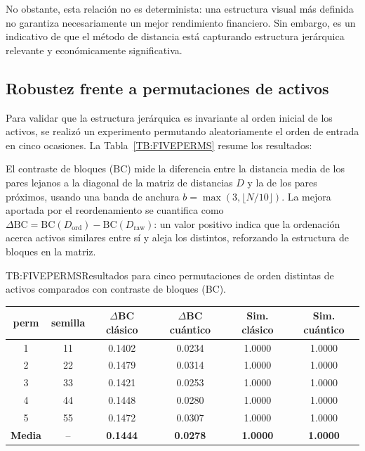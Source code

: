 No obstante, esta relación no es determinista: una estructura visual más definida no garantiza necesariamente un mejor rendimiento financiero. Sin embargo, es un indicativo de que el método de distancia está capturando estructura jerárquica relevante y económicamente significativa.

\subsection{Robustez frente a permutaciones de activos}
\label{subsec:robustez_permutaciones}

Para validar que la estructura jerárquica es invariante al orden inicial de los activos, se realizó un experimento permutando aleatoriamente el orden de entrada en cinco ocasiones. La Tabla~\ref{TB:FIVEPERMS} resume los resultados:

El contraste de bloques ($\mathrm{BC}$) mide la diferencia entre la distancia media de los pares lejanos a la diagonal de la matriz de distancias $D$ y la de los pares próximos, usando una banda de anchura $b = \max(3, \lfloor N/10 \rfloor)$. La mejora aportada por el reordenamiento se cuantifica como $\Delta\mathrm{BC} = \mathrm{BC}(D_{\text{ord}}) - \mathrm{BC}(D_{\text{raw}})$: un valor positivo indica que la ordenación acerca activos similares entre sí y aleja los distintos, reforzando la estructura de bloques en la matriz.

\begin{table}[Cinco permutaciones de activos]{TB:FIVEPERMS}{Resultados para cinco permutaciones de orden distintas de activos comparados con contraste de bloques (BC).}
\begin{tabular}{cccccc}
\hline
\textbf{perm} & \textbf{semilla} & \textbf{$\Delta$BC clásico} & \textbf{$\Delta$BC cuántico} & \textbf{Sim. clásico} & \textbf{Sim. cuántico} \\
\hline
1 & 11 & 0.1402 & 0.0234 & 1.0000 & 1.0000 \\
2 & 22 & 0.1479 & 0.0314 & 1.0000 & 1.0000 \\
3 & 33 & 0.1421 & 0.0253 & 1.0000 & 1.0000 \\
4 & 44 & 0.1448 & 0.0280 & 1.0000 & 1.0000 \\
5 & 55 & 0.1472 & 0.0307 & 1.0000 & 1.0000 \\
\hline
\textbf{Media} & -- & \textbf{0.1444} & \textbf{0.0278} & \textbf{1.0000} & \textbf{1.0000} \\
\hline
\end{tabular}
\end{table}

